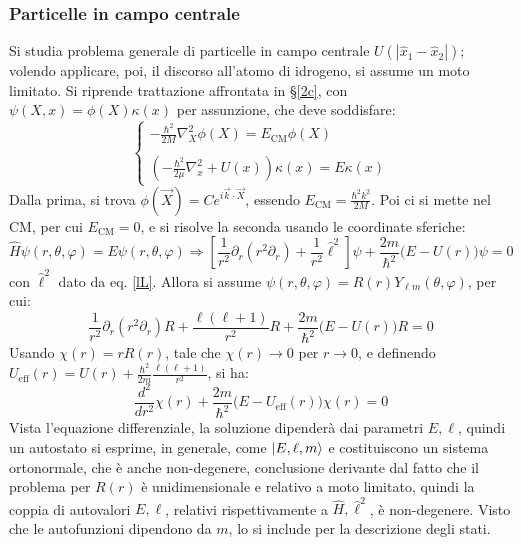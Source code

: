 \documentclass[10pt, a4paper]{scrartcl} %
\numberwithin{equation}{subsection}
\theoremstyle{style2}
\theoremstyle{style1}
\begin{document}
\subsubsection{Particelle in campo centrale}
Si studia problema generale di particelle in campo centrale $U(|\hat{x}_1 - \hat{x}_2|)$; volendo applicare, poi, il discorso all'atomo di idrogeno, si assume un moto limitato. Si riprende trattazione affrontata in \S\ref{2c}, con $\psi (X,x) = \phi (X) \kappa (x)$ per assunzione, che deve soddisfare:
\begin{equation}
	\begin{cases}
		\displaystyle - \frac{\hbar ^2}{2M} \nabla^2_X \phi (X) = E_\text{CM} \phi (X)\\ 
		\\
		\displaystyle \left(- \frac{\hbar ^2}{2\mu }\nabla ^2_x + U(x)\right) \kappa (x) = E\kappa (x)
	\end{cases}
\end{equation}
Dalla prima, si trova $\phi (\vec{X}) = C e^{i\vec{k}\cdot \vec{X}} $, essendo $E_\text{CM} = \frac{\hbar ^2 k^2}{2M}$. Poi ci si mette nel CM, per cui $E_\text{CM} = 0 $, e si risolve la seconda usando le coordinate sferiche:
\begin{equation}
	\hat{H} \psi (r,\theta ,\varphi ) = E \psi (r,\theta ,\varphi ) \Rightarrow  \left[ \frac{1}{r^2} \partial _r (r^2 \partial _r) + \frac{1}{r^2}\hat{\ell }^2 \right] \psi + \frac{2m}{\hbar ^2}\Big(E - U(r)\Big) \psi  = 0
\end{equation}
con $\hat{\ell }^2$ dato da eq. \ref{lL}. Allora si assume $\psi (r,\theta ,\varphi ) = R(r) Y_{\ell m} (\theta ,\varphi )$, per cui:
\[
\frac{1}{r^2}\partial _r (r^2 \partial _r) R + \frac{\ell (\ell +1)}{r^2}R + \frac{2m}{\hbar ^2}\Big(E - U(r)\Big) R = 0
\] 
Usando $\chi (r) = r R(r)$, tale che $\chi (r) \to 0$ per $r\to 0$, e definendo $U_\text{eff}(r) = U(r) + \frac{\hbar ^2}{2m}\frac{\ell (\ell +1)}{r^2}$, si ha:
\begin{equation}
	\frac{d ^2}{d r^2} \chi (r) + \frac{2m}{\hbar ^2}\Big(E - U_\text{eff}(r)\Big) \chi (r) = 0
\end{equation}
Vista l'equazione differenziale, la soluzione dipender\`a dai parametri $E, \ell $, quindi un autostato si esprime, in generale, come $\ket{E,\ell ,m} $ e costituiscono un sistema ortonormale, che \`e anche non-degenere, conclusione derivante dal fatto che il problema per $R(r)$ \`e unidimensionale e relativo a moto limitato, quindi la coppia di autovalori $E, \ell $, relativi rispettivamente a $\hat{H}, \hat{\ell }^2$, \`e non-degenere. Visto che le autofunzioni dipendono da $m$, lo si include per la descrizione degli stati.
\end{document}
